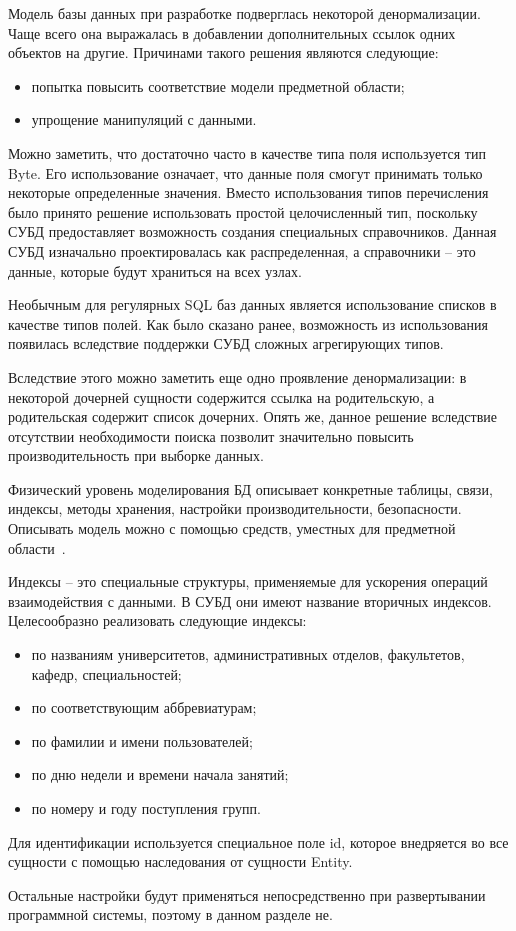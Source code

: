 Модель базы данных при разработке подверглась некоторой денормализации. Чаще всего она выражалась в добавлении дополнительных ссылок одних объектов на другие. Причинами такого решения являются следующие:

\begin{itemize}
	\item попытка повысить соответствие модели предметной области;
	\item упрощение манипуляций с данными.
\end{itemize}

Можно заметить, что достаточно часто в качестве типа поля используется тип Byte. Его использование означает, что данные поля смогут принимать только некоторые определенные значения. Вместо использования типов перечисления было принято решение использовать простой целочисленный тип, поскольку СУБД \nezaboodka предоставляет возможность создания специальных справочников. Данная СУБД изначально проектировалась как распределенная, а справочники -- это данные, которые будут храниться на всех узлах.

Необычным для регулярных SQL баз данных является использование списков в качестве типов полей. Как было сказано ранее, возможность из использования появилась вследствие поддержки СУБД сложных агрегирующих типов.

Вследствие этого можно заметить еще одно проявление денормализации: в некоторой дочерней сущности содержится ссылка на родительскую, а родительская содержит список дочерних. Опять же, данное решение вследствие отсутствии необходимости поиска позволит значительно повысить производительность при выборке данных.

Физический уровень моделирования БД описывает конкретные таблицы, связи, индексы, методы хранения, настройки производительности, безопасности. Описывать модель можно с помощью средств, уместных для предметной области~\cite{kulikov_db_workbook}. 

Индексы -- это специальные структуры, применяемые для ускорения операций взаимодействия с данными. В СУБД \nezaboodka они имеют название вторичных индексов. Целесообразно реализовать следующие индексы:

\begin{itemize}
	\item по названиям университетов, административных отделов, факультетов, кафедр, специальностей;
	\item по соответствующим аббревиатурам;
	\item по фамилии и имени пользователей;
	\item по дню недели и времени начала занятий;
	\item по номеру и году поступления групп.
\end{itemize}

Для идентификации используется специальное поле id, которое внедряется во все сущности с помощью наследования от сущности Entity.

Остальные настройки будут применяться непосредственно при развертывании программной системы, поэтому в данном разделе не.
